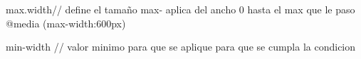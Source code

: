 max.width// define el tamaño max- aplica del ancho 0 hasta el max que le paso
@media (max-width:600px){
}

min-width // valor minimo para que se aplique para que se cumpla la condicion